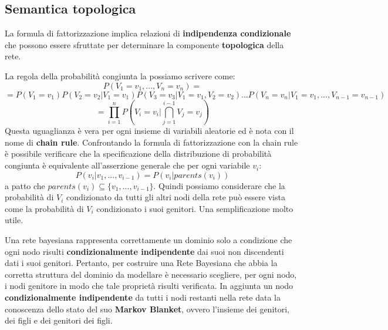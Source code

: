 \subsection{Semantica topologica}
La formula di fattorizzazione implica relazioni di \textbf{indipendenza condizionale}
che possono essere sfruttate per determinare la componente \textbf{topologica} della rete.

La regola della probabilità congiunta la possiamo scrivere come:
\begin{equation*}
    P(V_1= v_1,...,V_n = v_n) =
\end{equation*}
\begin{equation*}
    =P(V_1=v_1)P(V_2=v_2|V_1=v_1)P(V_3 =v_3|V_1=v_1,V_2=v_2)\dots P(V_n=v_n|V_1=v_1,...,V_{n-1}=v_{n-1})
\end{equation*}
\begin{equation*}
    =\prod_{i=1}^{n} P(V_i=v_i|\bigcap_{j=1} ^{i-1} V_j= v_j)
\end{equation*}
Questa uguaglianza è vera per ogni insieme di variabili aleatorie ed è nota con
il nome di \textbf{chain rule}. Confrontando la formula di fattorizzazione con
la chain rule è possibile verificare che la specificazione della distribuzione
di probabilità congiunta è equivalente all'asserzione generale che per ogni
variabile $v_i$:
\begin{equation}
    P(v_i|v_1,...,v_{i-1}) = P(v_i|parents(v_i))
\end{equation}
a patto che $parents(v_i) \subseteq \{v_1,...,v_{i-1}\}$. Quindi possiamo considerare
che la probabilità di $V_i$ condizionato da tutti gli altri nodi della rete può essere
vista come la probabilità di $V_i$ condizionato i suoi genitori. Una semplificazione
molto utile.

Una rete bayesiana rappresenta correttamente un dominio solo a condizione che ogni
nodo risulti \textbf{condizionalmente indipendente} dai suoi non discendenti dati i suoi
genitori. Pertanto, per costruire una Rete Bayesiana che abbia la corretta
struttura del dominio da modellare è necessario scegliere, per ogni nodo, i nodi
genitore in modo che tale proprietà risulti verificata. In aggiunta un nodo 
\textbf{condizionalmente indipendente} da tutti i nodi restanti nella rete data 
la conoscenza dello stato del suo \textbf{Markov Blanket}, ovvero l'insieme dei 
genitori, dei figli e dei genitori dei figli.

